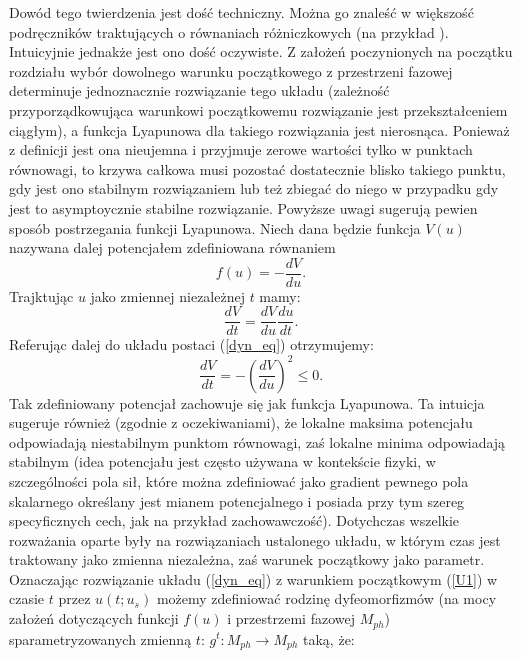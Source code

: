 \documentclass[12pt]{article}
\begin{document}
Dowód tego twierdzenia jest dość techniczny. Można go znaleść w większość podręczników traktujących o równaniach różniczkowych (na przykład \cite{Palczewski}). Intuicyjnie jednakże jest ono dość oczywiste. Z założeń poczynionych na początku rozdziału wybór dowolnego warunku początkowego z przestrzeni fazowej determinuje jednoznacznie rozwiązanie tego układu (zależność przyporządkowująca warunkowi początkowemu rozwiązanie jest przekształceniem ciągłym), a funkcja Lyapunowa dla takiego rozwiązania jest nierosnąca. Ponieważ z definicji jest ona nieujemna i przyjmuje zerowe wartości tylko w punktach równowagi, to krzywa całkowa musi pozostać dostatecznie blisko takiego punktu, gdy jest ono stabilnym rozwiązaniem lub też zbiegać do niego w przypadku gdy jest to asymptoycznie stabilne rozwiązanie.\newline
Powyższe uwagi sugerują pewien sposób postrzegania funkcji Lyapunowa. Niech dana będzie funkcja $ V(u) $ nazywana dalej potencjałem zdefiniowana równaniem 
\begin{equation}
f(u) = -\frac{dV}{du}.
\end{equation}
Trajktując $ u $ jako zmiennej niezależnej $ t $ mamy:
\begin{equation}
\frac{dV}{dt} = \frac{dV}{du}\frac{du}{dt}.
\end{equation}
Referując dalej do układu postaci (\ref{dyn_eq}) otrzymujemy:
\begin{equation}
\frac{dV}{dt} = -(\frac{dV}{du})^2 \leq 0.
\end{equation}
Tak zdefiniowany potencjał zachowuje się jak funkcja Lyapunowa. Ta intuicja sugeruje również (zgodnie z oczekiwaniami), że lokalne maksima potencjału odpowiadają niestabilnym punktom równowagi, zaś lokalne minima odpowiadają stabilnym (idea potencjału jest często używana w kontekście fizyki, w szczególności pola sił, które można zdefiniować jako gradient pewnego pola skalarnego określany jest mianem potencjalnego i posiada przy tym szereg specyficznych cech, jak na przykład zachowawczość).\newline
Dotychczas wszelkie rozważania oparte były na rozwiązaniach ustalonego układu, w którym czas jest traktowany jako zmienna niezależna, zaś warunek początkowy jako parametr. Oznaczając rozwiązanie układu (\ref{dyn_eq}) z warunkiem początkowym (\ref{U1}) w czasie $ t $ przez $ u(t;u_{s}) $ możemy zdefiniować rodzinę dyfeomorfizmów (na mocy założeń dotyczących funkcji $ f(u) $ i przestrzemi fazowej $ M_{ph} $) sparametryzowanych zmienną $ t $: $ g^t:M_{ph} \rightarrow M_{ph} $ taką, że: 
\end{document}
